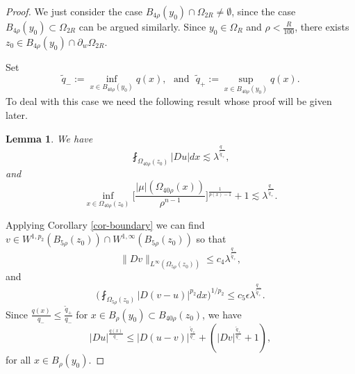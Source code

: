 \documentclass[a4paper,10pt]{amsart}
\newtheorem{lem}[thm]{Lemma}
\newcommand{\lesi}{\lesssim}
\newcommand{\f}{\frac}
\newcommand{\Om}{\Omega}
\newcommand{\vc}{\infty}
\begin{document}
\begin{proof}
		
		We just consider the case $B_{4\rho}(y_0)\cap \Omega_{2R}\neq \emptyset$, since the case  $B_{4\rho}(y_0)\subset \Omega_{2R}$ can be argued similarly. Since $y_0\in \Om_{R}$ and $\rho<\f{R}{100}$,  there exists $z_0\in B_{4\rho}(y_0)\cap \partial_w \Omega_{2R}$.
		
		Set $$
		\tilde{q}_-:=\inf_{x\in B_{40\rho}(y_0)}q(x), \ \ \ \text{and} \ \ \ \tilde{q}_+:=\sup_{x\in B_{40\rho}(y_0)}q(x).
		$$
		To deal with this case we need the following result whose proof will be given later.
		
        \begin{lem}
        	\label{lem1-proof}
        We have
		\begin{equation}\label{eq1-proof lemma good lambda}
		\fint_{\Om_{40\rho}(z_0)}|Du|dx\lesi  \lambda^{\f{q_-}{\tilde{q}_+}},
		\end{equation}
		and
		\begin{equation}\label{eq2-proof lemma good lambda}
		\inf_{x\in \Om_{40\rho}(z_0)}\Big[\f{|\mu|(\Om_{40\rho}(x))}{\rho^{n-1}}\Big]^{\f{1}{p(x)-1}}+1\lesi \lambda^{\f{q_-}{\tilde{q}_+}}.
		\end{equation}
		\end{lem}	
		
		Applying Corollary \ref{cor-boundary} we can find $v\in W^{1,p_2}(B_{5\rho}(z_0))\cap W^{1,\vc}(B_{5\rho}(z_0))$ so that 
		\begin{equation}\label{eq1-proof good lambda}
		\|Dv\|_{L^{\vc}(\Om_{5\rho}(z_0))}\leq c_4 \lambda^{\f{q_-}{\tilde{q}_+}},
		\end{equation}
		and
		\begin{equation}\label{eq2-proof good lambda}
		\Big(\fint_{\Om_{5\rho}(z_0)}|D(v-u)|^{p_2}dx\Big)^{1/p_2}\leq c_5\epsilon \lambda^{\f{q_-}{\tilde{q}_+}}.
		\end{equation}
		Since $\f{q(x)}{q_-}\leq \f{\tilde{q}_+}{q_-}$ for $x\in B_{\rho}(y_0)\subset B_{40\rho}(z_0)$, we have
	    $$
	    |Du|^{\f{q(x)}{q_-}}\leq |D(u-v)|^{\f{\tilde{q}_+}{q_-}}+(|Dv|^{\f{\tilde{q}_+}{q_-}}+1), 
	    $$
	    for all $x\in B_{\rho}(y_0)$.
	    

\end{proof}
\end{document}

